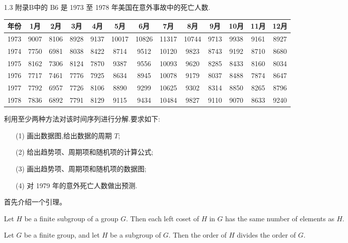 \documentclass[12pt]{article}
\begin{document}
\lstset{numbers=left, xleftmargin=1.5em,xrightmargin=0.5em, aboveskip=0.5em}
\maketitle
\pagebreak
\begin{homeworkProblem}
1.3 附录B中的 B6 是 1973 至 1978 年美国在意外事故中的死亡人数.
\FloatBarrier
\renewcommand\arraystretch{1.5}
\begin{table}[H]
\begin{tabular}{|c|c|c|c|c|c|c|c|c|c|c|c|c|}
\hline
年份   & 1月   & 2月   & 3月   & 4月   & 5月    & 6月    & 7月    & 8月    & 9月   & 10月  & 11月  & 12月  \\ \hline
1973 & 9007 & 8106 & 8928 & 9137 & 10017 & 10826 & 11317 & 10744 & 9713 & 9938 & 9161 & 8927 \\ \hline
1974 & 7750 & 6981 & 8038 & 8422 & 8714  & 9512  & 10120 & 9823  & 8743 & 9192 & 8710 & 8680 \\ \hline
1975 & 8162 & 7306 & 8124 & 7870 & 9387  & 9556  & 10093 & 9620  & 8285 & 8433 & 8160 & 8034 \\ \hline
1976 & 7717 & 7461 & 7776 & 7925 & 8634  & 8945  & 10078 & 9179  & 8037 & 8488 & 7874 & 8647 \\ \hline
1977 & 7792 & 6957 & 7726 & 8106 & 8890  & 9299  & 10625 & 9302  & 8314 & 8850 & 8265 & 8796 \\ \hline
1978 & 7836 & 6892 & 7791 & 8129 & 9115  & 9434  & 10484 & 9827  & 9110 & 9070 & 8633 & 9240 \\ \hline
\end{tabular}
\end{table}
\FloatBarrier
利用至少两种方法对该时间序列进行分解.要求如下:
\begin{itemize}
\item[(1)] 画出数据图,给出数据的周期 $T$;
\item[(2)] 给出趋势项、周期项和随机项的计算公式;
\item[(3)] 画出趋势项、周期项和随机项的数据图;
\item[(4)] 对 1979 年的意外死亡人数做出预测.
\end{itemize}
\solution
首先介绍一个引理。
\begin{lemma}
Let $H$ be a finite subgroup of a group $G$.  Then each left
coset of $H$ in $G$ has the same number of elements as $H$.
\end{lemma}

\begin{theorem}
Let $G$ be a finite group, and let $H$ be a subgroup
of $G$.  Then the order of $H$ divides the order of $G$.
\end{theorem}


\end{homeworkProblem}
\end{document}
